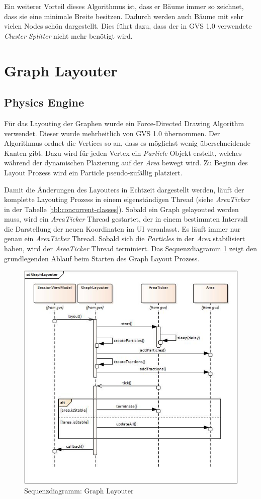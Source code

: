 \documentclass[11pt,a4paper,english,oneside]{book}
\numberwithin{equation}{chapter}
\begin{document}
	\noindent
	Ein weiterer Vorteil dieses Algorithmus ist, dass er Bäume immer so zeichnet, dass sie eine minimale Breite besitzen. Dadurch werden auch Bäume mit sehr vielen Nodes schön dargestellt. Dies führt dazu, dass der in GVS 1.0 \cite{gvs1} verwendete \textit{Cluster Splitter} nicht mehr benötigt wird. 
	
	
	
	\section{Graph Layouter}
	
	\subsection{Physics Engine} \label{ssec:graphlayouter}
	Für das Layouting der Graphen wurde ein Force-Directed Drawing Algorithm verwendet. Dieser wurde mehrheitlich von GVS 1.0 übernommen. Der Algorithmus ordnet die Vertices so an, dass es möglichst wenig überschneidende Kanten gibt. Dazu wird für jeden Vertex ein \textit{Particle} Objekt erstellt, welches während der dynamischen Plazierung auf der \textit{Area} bewegt wird. Zu Beginn des Layout Prozess wird ein Particle pseudo-zufällig platziert.
	
	Damit die Änderungen des Layouters in Echtzeit dargestellt werden, läuft der komplette Layouting Prozess in einem eigenständigen Thread (siehe \textit{AreaTicker} in der Tabelle \ref{tbl:concurrent-classes}). Sobald ein Graph gelayouted werden muss, wird ein \textit{AreaTicker} Thread gestartet, der in einem bestimmten Intervall die Darstellung der neuen Koordinaten im UI veranlasst. Es läuft immer nur genau ein \textit{AreaTicker} Thread. Sobald sich die \textit{Particles} in der \textit{Area} stabilisiert haben, wird der \textit{AreaTicker} Thread terminiert. Das Sequenzdiagramm \ref{fig:sequencegraphlayouter} zeigt den grundlegenden Ablauf beim Starten des Graph Layout Prozess.
	
	\begin{figure}[h!]
		\centering
		\includegraphics[width=0.6\linewidth]{assets/images/sequence_graph_layouter}
		\caption{Sequenzdiagramm: Graph Layouter}
		\label{fig:sequencegraphlayouter}
	\end{figure}
	
\end{document}
